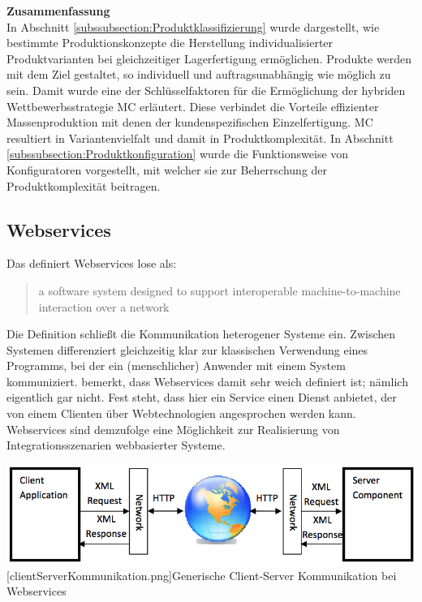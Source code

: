 \documentclass[12pt,a4paper,bibliography=totocnumbered,listof=totoc]{scrartcl}
\begin{document}
\textbf{Zusammenfassung}\\
In Abschnitt \ref{subssubsection:Produktklassifizierung} wurde dargestellt, wie bestimmte Produktionskonzepte die Herstellung individualisierter Produktvarianten bei gleichzeitiger Lagerfertigung ermöglichen. Produkte werden mit dem Ziel gestaltet, so individuell und auftragsunabhängig wie möglich zu sein. Damit wurde eine der Schlüsselfaktoren für die Ermöglichung der hybriden Wettbewerbsstrategie \ac{MC} erläutert. Diese verbindet die Vorteile effizienter Massenproduktion mit denen
der kundenspezifischen Einzelfertigung\citep{piller98}. \ac{MC} resultiert in Variantenvielfalt und damit in Produktkomplexität. In Abschnitt \ref{subssubsection:Produktkonfiguration} wurde die Funktionsweise von Konfiguratoren vorgestellt, mit welcher sie zur Beherrschung der Produktkomplexität beitragen.


\pagebreak
\subsection{Webservices}
\label{subsection:Webservices}

Das \citet	{w3c04} definiert Webservices lose als:

\begin{quote}
\glqq [...] a software system designed to support interoperable machine-to-machine interaction over a network\grqq
\end{quote}

Die Definition schließt die Kommunikation heterogener Systeme ein. \glqq Zwischen Systemen\grqq{} differenziert gleichzeitig klar zur klassischen Verwendung eines Programms, bei der ein (menschlicher) Anwender mit einem System kommuniziert. \citet{tilkov11} bemerkt, dass Webservices damit sehr weich definiert ist; \glqq nämlich eigentlich gar nicht\grqq{}. Fest steht, dass hier ein Service einen Dienst anbietet, der von einem Clienten über Webtechnologien angesprochen werden kann. Webservices sind demzufolge eine Möglichkeit zur Realisierung von Integrationsszenarien webbasierter Systeme.

\vspace{1em}
\begin{minipage}{\linewidth}
	\centering
	\includegraphics[width=0.7\linewidth]{Abbildungen/clientServerKommunikation.png}
	[clientServerKommunikation.png]{Generische Client-Server Kommunikation bei Webservices}
	\label{fig:clientServerKommunikation.png}
\end{minipage}
\vspace{1em}
\end{document}
